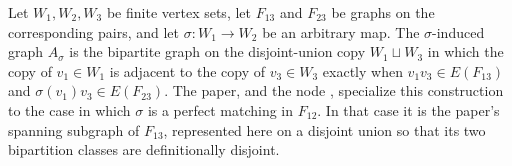 \begin{definition}
Let $W_1,W_2,W_3$ be finite vertex sets, let $F_{13}$ and $F_{23}$ be graphs on the corresponding pairs, and let $\sigma:W_1\to W_2$ be an arbitrary map.  The $\sigma$-induced graph $A_\sigma$ is the bipartite graph on the disjoint-union copy $W_1\sqcup W_3$ in which the copy of $v_1\in W_1$ is adjacent to the copy of $v_3\in W_3$ exactly when $v_1v_3\in E(F_{13})$ and $\sigma(v_1)v_3\in E(F_{23})$.  The paper, and the node , specialize this construction to the case in which $\sigma$ is a perfect matching in $F_{12}$.  In that case it is the paper's spanning subgraph of $F_{13}$, represented here on a disjoint union so that its two bipartition classes are definitionally disjoint.
\end{definition}
